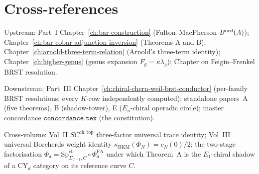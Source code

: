 \section*{Cross-references}

Upstream: Part~I Chapter~\ref{ch:bar-construction} (Fulton--MacPherson
$B^{\mathrm{ord}}(A)$); Chapter~\ref{ch:bar-cobar-adjunction-inversion} (Theorems
A and B); Chapter~\ref{ch:arnold-three-term-relation} (Arnold's
three-term identity); Chapter~\ref{ch:higher-genus} (genus expansion
$F_g=\kappa\lambda_g$); Chapter on Feigin--Frenkel BRST resolution.

Downstream: Part~III Chapter~\ref{ch:chiral-chern-weil-brst-conductor}
(per-family BRST resolutions; every $K$-row independently computed);
standalone papers~A (five theorems), B (shadow-tower), E
($E_n$-chiral operadic circle); master concordance
$\texttt{concordance.tex}$ (the constitution).

Cross-volume: Vol~II $SC^{\mathrm{ch,top}}$ three-factor universal
trace identity; Vol~III universal Borcherds weight identity
$\kappa_{\mathrm{BKM}}(\Phi_N)=c_N(0)/2$; the two-stage factorisation
$\Phi_d=\mathrm{Sp}^{\mathrm{ch}}_{\Sigma_{d-1},C}\circ\Phi^{\mathrm{FA}}_d$
under which Theorem~A is the $E_1$-chiral shadow of a CY$_d$ category
on its reference curve $C$.

